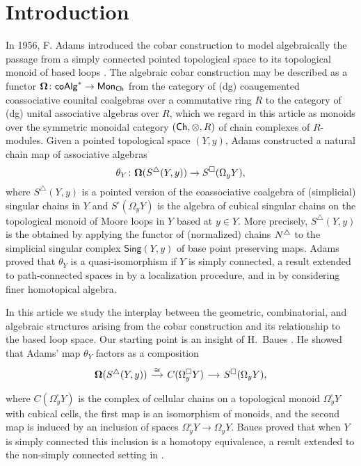 
\section{Introduction}

In 1956, F. Adams introduced the cobar construction to model algebraically the passage from a simply connected pointed topological space to its topological monoid of based loops \cite{adams1956cobar}.
The algebraic cobar construction may be described as a functor $\mathbf{\Omega} \colon \mathsf{coAlg}^* \to \mathsf{Mon}_{\mathsf{Ch}}$ from the category of (dg) coaugemented coassociative counital coalgebras over a commutative ring $R$ to the category of (dg) unital associative algebras over $R$, which we regard in this article as monoids over the symmetric monoidal category $(\mathsf{Ch}, \otimes, R) $ of chain complexes of $R$-modules.
Given a pointed topological space $(Y, y)$, Adams constructed a natural chain map of associative algebras
\begin{equation*}
\theta_Y \colon \mathbf{\Omega}(S^\triangle(Y, y)) \to S^{\square}(\Omega_y Y),
\end{equation*}
where $S^\triangle(Y,y)$ is a pointed version of the coassociative coalgebra of (simplicial) singular chains in $Y$ and $S^{\square}(\Omega_yY)$ is the algebra of cubical singular chains on the topological monoid of Moore loops in $Y$ based at $y \in Y$.
More precisely, $S^\triangle(Y,y)$ is the obtained by applying the functor of (normalized) chains $N^{\triangle}$ to the simplicial singular complex $\mathsf{Sing}(Y, y)$ of base point preserving maps.
Adams proved that $\theta_Y$ is a quasi-isomorphism if $Y$ is simply connected, a result extended to path-connected spaces in \cite{hess2010cobar} by a localization procedure, and in \cite{rivera2018cubical} by considering finer homotopical algebra.

In this article we study the interplay between the geometric, combinatorial, and algebraic structures arising from the cobar construction and its relationship to the based loop space.
Our starting point is an insight of H.~Baues \cite{baues1998hopf}.
He showed that Adams' map $\theta_Y$ factors as a composition
\begin{equation} \label{e:baues factorization of adams map}
\begin{tikzcd}[column sep = small]
\cobar(S^\triangle(Y, y)) \arrow[r, "\cong"] &
C(\Omega^{\square}_y Y) \arrow[r] &
S^{\square}(\Omega_y Y),
\end{tikzcd}
\end{equation}
where $C(\Omega^{\square}_y Y)$ is the complex of cellular chains on a topological monoid $\Omega^{\square}_y Y$ with cubical cells, the first map is an isomorphism of monoids, and the second map is induced by an inclusion of spaces $\Omega^{\square}_yY \to \Omega_yY$.
Baues proved that when $Y$ is simply connected this inclusion is a homotopy equivalence, a result extended to the non-simply connected setting in \cite{rivera2019path}.

